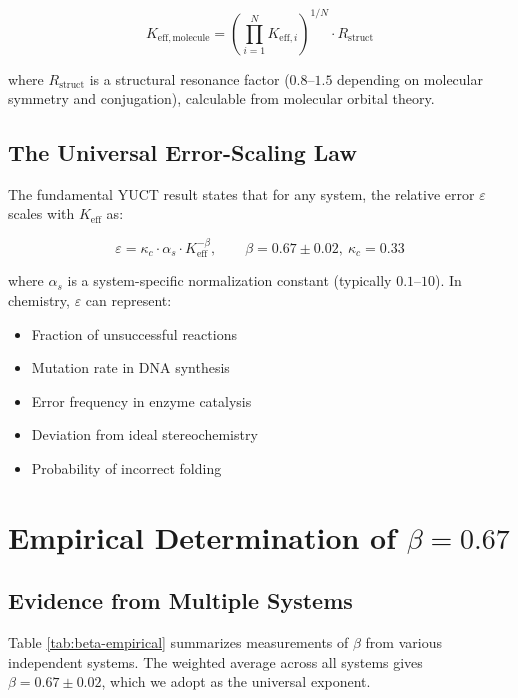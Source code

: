\documentclass[12pt,a4paper]{article}
\theoremstyle{remark}
\newcommand{\Keff}{K_{\mathrm{eff}}}
\newcommand{\kappac}{\kappa_c}
\newcommand{\eps}{\varepsilon}
\newcommand{\Rstruct}{R_{\mathrm{struct}}}
\begin{document}
	\begin{equation}
		K_{\mathrm{eff},\text{molecule}} = \left(\prod_{i=1}^{N} K_{\mathrm{eff},i}\right)^{1/N} \cdot \Rstruct
		\label{eq:keff-molecule}
	\end{equation}
	
	where $\Rstruct$ is a structural resonance factor ($0.8$--$1.5$ depending on molecular symmetry and conjugation), calculable from molecular orbital theory.
	
	\subsection{The Universal Error-Scaling Law}
	
	The fundamental YUCT result states that for any system, the relative error $\eps$ scales with $\Keff$ as:
	
	\begin{equation}
		\boxed{\eps = \kappac \cdot \alpha_s \cdot \Keff^{-\beta}, \qquad \beta = 0.67 \pm 0.02, \ \kappac = 0.33}
		\label{eq:universal-error}
	\end{equation}
	
	where $\alpha_s$ is a system-specific normalization constant (typically $0.1$--$10$). In chemistry, $\eps$ can represent:
	\begin{itemize}
		\item Fraction of unsuccessful reactions
		\item Mutation rate in DNA synthesis
		\item Error frequency in enzyme catalysis
		\item Deviation from ideal stereochemistry
		\item Probability of incorrect folding
	\end{itemize}
	
	\section{Empirical Determination of $\beta = 0.67$}
	\label{sec:empirical-beta}
	
	\subsection{Evidence from Multiple Systems}
	
	Table \ref{tab:beta-empirical} summarizes measurements of $\beta$ from various independent systems. The weighted average across all systems gives $\beta = 0.67 \pm 0.02$, which we adopt as the universal exponent.
	
\end{document}
